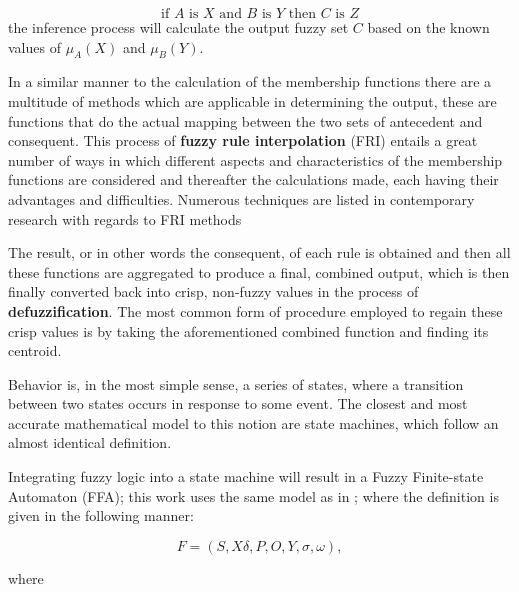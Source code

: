 \[
	\text{if } A \text{ is } X \text{ and } B \text{ is } Y \text{ then } C \text{ is } Z
\]
the inference process will calculate the output fuzzy set $C$ based on the known values of $\mu_A(X)$ and $\mu_B(Y)$.

In a similar manner to the calculation of the membership functions there are a multitude of methods which are applicable in determining the output, these are functions that do the actual mapping between the two sets of antecedent and consequent. This process of \textbf{fuzzy rule interpolation} (FRI) entails a great number of ways in which different aspects and characteristics of the membership functions are considered and thereafter the calculations made, each having their advantages and difficulties. Numerous techniques are listed in contemporary research with regards to FRI methods \cite{kovacsjohanyak2018}

The result, or in other words the consequent, of each rule is obtained and then all these functions are aggregated to produce a final, combined output, which is then finally converted back into crisp, non-fuzzy values in the process of \textbf{defuzzification}. The most common form of procedure employed to regain these crisp values is by taking the aforementioned combined function and finding its centroid.

Behavior is, in the most simple sense, a series of states, where a transition between two states occurs in response to some event. The closest and most accurate mathematical model to this notion are state machines, which follow an almost identical definition. 

Integrating fuzzy logic into a state machine will result in a Fuzzy Finite-state Automaton (FFA); this work uses the same model as in \cite{pillerkovacs2015}; where the definition is given in the following manner:

\[
	F = (S, X \delta, P, O, Y, \sigma, \omega),
\]

\noindent where

